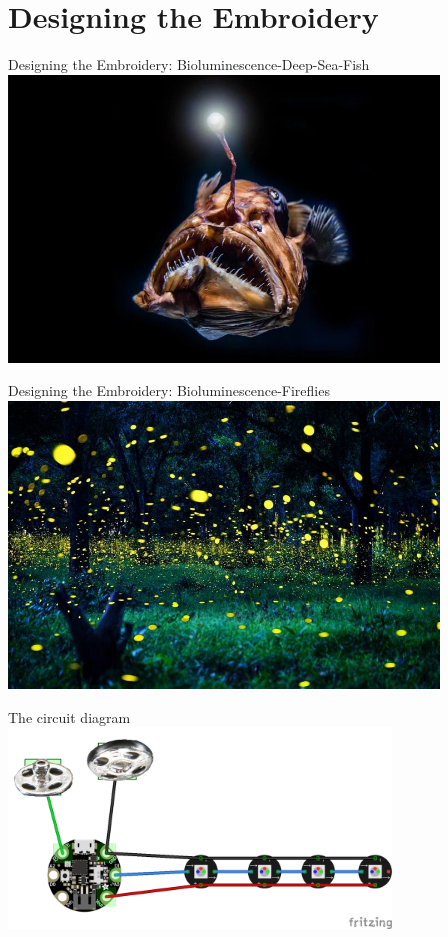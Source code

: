 \documentclass{beamer}
\begin{document}
\part{Designing the Embroidery}
\begin{frame}[fragile]{Designing the Embroidery: Bioluminescence-Deep-Sea-Fish}
\includegraphics[height=3in]{Bioluminescence-Deep-Sea-Fish-777x518.jpg}
\end{frame}
\begin{frame}[fragile]{Designing the Embroidery: Bioluminescence-Fireflies}
\includegraphics[height=3in]{Bioluminescence-Fireflies-777x518.jpg}
\end{frame}
\begin{frame}[fragile]{The circuit diagram}
\includegraphics[width=4in]{CircuitDiagram_bb.png}
\end{frame}
\end{document}
